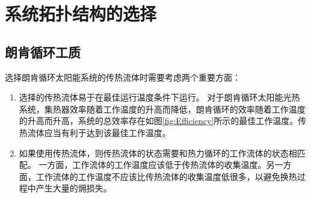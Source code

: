 \section{系统拓扑结构的选择}
\label{sec:sts}
\subsection{朗肯循环工质}

选择朗肯循环太阳能系统的传热流体时需要考虑两个重要方面：
\begin{enumerate}
  \item 选择的传热流体易于在最佳运行温度条件下运行。
 对于朗肯循环太阳能光热系统，集热器效率随着工作温度的升高而降低，朗肯循环的效率随着工作温度的升高而升高，系统的总效率存在如图\ref{fig:Efficiency}所示的最佳工作温度。传热流体应当有利于达到该最佳工作温度。  
  
  \item 如果使用传热流体，则传热流体的状态需要和热力循环的工作流体的状态相匹配。
  一方面，工作流体的工作温度应该低于传热流体的收集温度。另一方面，工作流体的工作温度不应该比传热流体的收集温度低很多，以避免换热过程中产生大量的㶲损失。
  
\end{enumerate}
